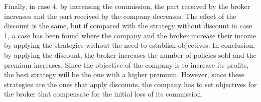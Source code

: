 \documentclass[review]{elsarticle}
\begin{document}

Finally, in case 4, by increasing the commission, the part received by the broker increases and the part received by the company decreases. The effect of the discount is the same, but if compared with the strategy without discount in case 1, a case has been found where the company and the broker increase their income by applying the strategies without the need to establish objectives.
In conclusion, by applying the discount, the broker increases the number of policies sold and the premium increases. Since the objective of the company is to increase its profits, the best strategy will be the one with a higher premium. However, since these strategies are the ones that apply discounts, the company has to set objectives for the broker that compensate for the initial loss of its commission.

\end{document}
